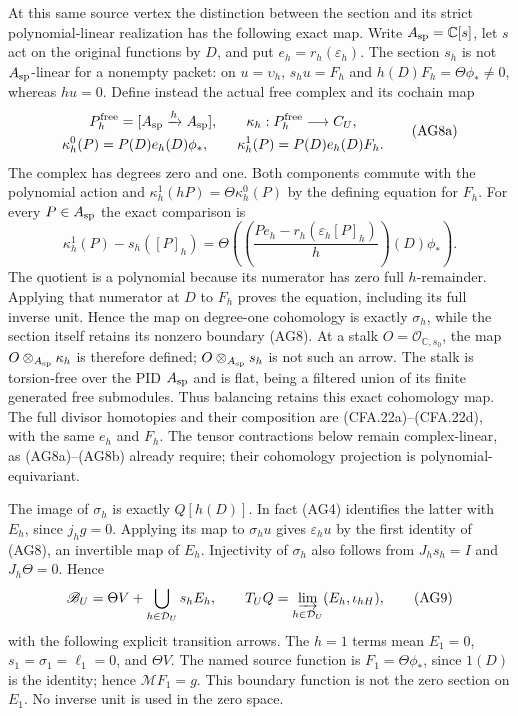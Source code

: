 At this same source vertex the distinction between the section and
its strict polynomial-linear realization has the following exact map.
Write $A_{\rm sp}=\mathbb C[s]$, let $s$ act on the original functions
by $D$, and put $e_h=r_h(\varepsilon_h)$. The section $s_h$ is not
$A_{\rm sp}$-linear for a nonempty packet: on $u=\upsilon_h$,
$s_hu=F_h$ and $h(D)F_h=\Theta\phi_*\ne0$, whereas $hu=0$.
Define instead the actual free complex and its cochain map
\[
\begin{gathered}
 P_h^{\rm free}=[A_{\rm sp}\xrightarrow{h}A_{\rm sp}],\qquad
 \kappa_h:P_h^{\rm free}\longrightarrow C_U,\\
 \kappa_h^0(P)=P(D)e_h(D)\phi_*,\qquad
 \kappa_h^1(P)=P(D)e_h(D)F_h .
\end{gathered}                                                   \tag{AG8a}
\]
The complex has degrees zero and one. Both components commute with
the polynomial action and
$\kappa_h^1(hP)=\Theta\kappa_h^0(P)$ by the defining equation
for $F_h$. For every $P\in A_{\rm sp}$ the exact comparison is
\[
 \kappa_h^1(P)-s_h([P]_h)
   =\Theta\left(
      \left(\frac{P e_h-r_h(\varepsilon_h[P]_h)}{h}\right)(D)
                 \phi_*\right).                              \tag{AG8b}
\]
The quotient is a polynomial because its numerator has zero full
$h$-remainder. Applying that numerator at $D$ to $F_h$ proves the
equation, including its full inverse unit. Hence the map on degree-one
cohomology is exactly $\sigma_h$, while the section itself retains
its nonzero boundary (AG8). At a stalk $O=\mathcal O_{\mathbb C,s_0}$,
the map $O\otimes_{A_{\rm sp}}\kappa_h$ is therefore defined;
$O\otimes_{A_{\rm sp}}s_h$ is not such an arrow. The stalk is
torsion-free over the PID $A_{\rm sp}$ and is flat, being a filtered
union of its finite generated free submodules. Thus balancing retains
this exact cohomology map. The full divisor homotopies and their
composition are (CFA.22a)--(CFA.22d), with the same $e_h$ and $F_h$.
The tensor contractions below remain complex-linear, as (AG8a)--(AG8b)
already require; their cohomology projection is polynomial-equivariant.

The image of $\sigma_h$ is exactly $Q[h(D)]$.  In fact (AG4)
identifies the latter with $E_h$, since $j_hg=0$.  Applying its
map to $\sigma_hu$ gives $\varepsilon_hu$ by the first identity
of (AG8), an invertible map of $E_h$.  Injectivity of $\sigma_h$
also follows from $J_hs_h=I$ and $J_h\Theta=0$.  Hence
\[
 \mathscr B_U=\Theta V+\bigcup_{h\in\mathcal D_U}s_hE_h,
 \qquad
 T_UQ=\varinjlim_{h\in\mathcal D_U}(E_h,\iota_{hH}),
 \tag{AG9}
\]
with the following explicit transition arrows.  The $h=1$ terms
mean $E_1=0$, $s_1=\sigma_1=\ell_1=0$, and $\Theta V$.
The named source function is $F_1=\Theta\phi_*$, since $1(D)$ is
the identity; hence $\mathcal M F_1=g$. This boundary function is not
the zero section on $E_1$. No inverse unit is used in the zero space.

